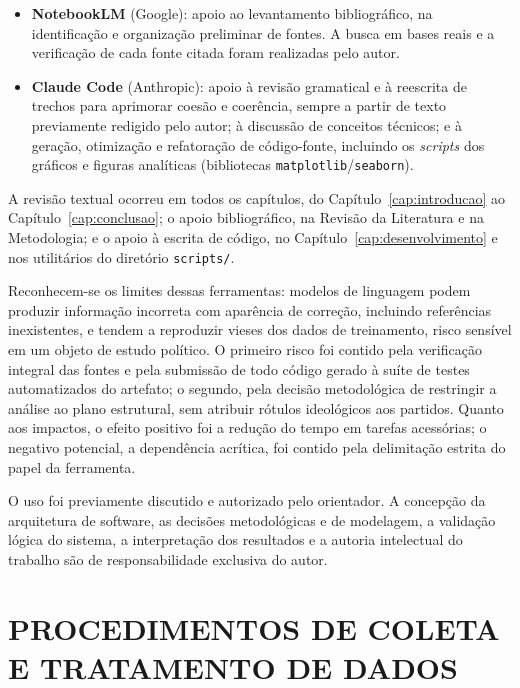 \documentclass[
      12pt,
      a4paper,
      openright,
      oneside,
      chapter=TITLE,
      section=TITLE,
      english,
      french,
      spanish,
      brazilian
    ]{abntex2}
\begin{document}
    \begin{itemize}
        \item \textbf{NotebookLM} (Google): apoio ao levantamento bibliográfico, na
        identificação e organização preliminar de fontes. A busca em bases reais e a
        verificação de cada fonte citada foram realizadas pelo autor.
        \item \textbf{Claude Code} (Anthropic): apoio à revisão gramatical e à reescrita
        de trechos para aprimorar coesão e coerência, sempre a partir de texto previamente
        redigido pelo autor; à discussão de conceitos técnicos; e à geração, otimização e
        refatoração de código-fonte, incluindo os \textit{scripts} dos gráficos e figuras
        analíticas (bibliotecas \texttt{matplotlib}/\texttt{seaborn}).
    \end{itemize}

    A revisão textual ocorreu em todos os capítulos, do Capítulo~\ref{cap:introducao} ao
    Capítulo~\ref{cap:conclusao}; o apoio bibliográfico, na Revisão da Literatura e na
    Metodologia; e o apoio à escrita de código, no Capítulo~\ref{cap:desenvolvimento} e
    nos utilitários do diretório \texttt{scripts/}.

    Reconhecem-se os limites dessas ferramentas: modelos de linguagem podem produzir
    informação incorreta com aparência de correção, incluindo referências inexistentes, e
    tendem a reproduzir vieses dos dados de treinamento, risco sensível em um objeto de
    estudo político. O primeiro risco foi contido pela verificação integral das fontes e
    pela submissão de todo código gerado à suíte de testes automatizados do artefato; o
    segundo, pela decisão metodológica de restringir a análise ao plano estrutural, sem
    atribuir rótulos ideológicos aos partidos. Quanto aos impactos, o efeito positivo foi
    a redução do tempo em tarefas acessórias; o negativo potencial, a dependência
    acrítica, foi contido pela delimitação estrita do papel da ferramenta.

   O uso foi previamente discutido e autorizado pelo orientador. A concepção da
   arquitetura de software, as decisões metodológicas e de modelagem, a validação lógica
   do sistema, a interpretação dos resultados e a autoria intelectual do trabalho são de
   responsabilidade exclusiva do autor.
    
    \section{PROCEDIMENTOS DE COLETA E TRATAMENTO DE DADOS}
    \label{sec:procedimentos}
    
\end{document}
